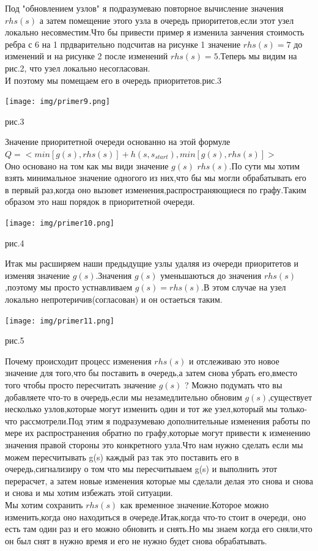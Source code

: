 \documentclass[12pt]{article}
\begin{document}
Под "обновлением узлов" я подразумеваю повторное вычисление значения $rhs(s)$ а затем помещение этого узла в очередь приоритетов,если этот узел локально несовместим.Что бы привести пример я изменила занчения стоимость ребра с 6 на 1 прдварительно подсчитав на рисунке 1 значение $rhs(s)=7$ до изменений и на рисунке 2 после изменений $rhs(s)=5$.Теперь мы видим на рис.2, что узел локально несогласован.\\
И поэтому мы помещаем его в очередь приоритетов.рис.3
\begin{center}
        \texttt{[image: img/primer9.png]}
        \caption{рис.3}
\end{center}
Значение приоритетной очереди основанно на этой формуле\\
$Q = <min[g(s),rhs(s)]+h(s,s_{start}),min[g(s),rhs(s)]>$\\
Оно основано на том как мы види значение $g(s)$ $rhs(s)$.По сути мы хотим взять минимальное значение одногого из них,что бы мы могли обрабатывать его в первый раз,когда оно вызовет изменения,распространяющиеся по графу.Таким образом это наш порядок в приоритетной очереди.
\begin{center}
        \texttt{[image: img/primer10.png]}
        \caption{рис.4}
\end{center}
Итак мы расширяем наши предыдущие узлы удаляя из очереди приоритетов и изменяя значение $g(s)$.Значения $g(s)$ уменьшаються до значения $rhs(s)$,поэтому мы просто устнавливаем $g(s)=rhs(s)$.В этом случае на узел локально непротеричив(согласован) и он остаеться таким.
\begin{center}
        \texttt{[image: img/primer11.png]}
        \caption{рис.5}
\end{center}
Почему происходит процесс изменения $rhs(s)$ и отслеживаю это новое значение для того,что бы поставить в очередь,а затем снова убрать его,вместо того чтобы просто пересчитать значение $g(s)$ ? Можно подумать что вы добавляете что-то в очередь,если мы незамедлительно обновим $g(s)$,существует несколько узлов,которые могут изменить один и тот же узел,который мы только-что рассмотрели.Под этим я подразумеваю дополнительные изменения работы по мере их распространения обратно по графу,которые могут привести к изменению значения правой стороны это конкретного узла.Что нам нужно сделать если мы можем пересчитывать g(s) каждый раз так это поставить его в очередь,сигнализиру о том что мы пересчитываем g(s) и выполнить этот перерасчет, а затем новые изменения которые мы сделали делая это снова и снова и снова и мы хотим избежать этой ситуации.\\
Мы хотим сохранить $rhs(s)$ как временное значение.Которое можно изменить,когда оно находиться в очереде.Итак,когда что-то стоит в очереди, оно есть там один раз и его можно обновить и снять.Но мы знаем когда его сняли,что он был снят в нужно время и его не нужно будет снова обрабатывать.
\end{document}

